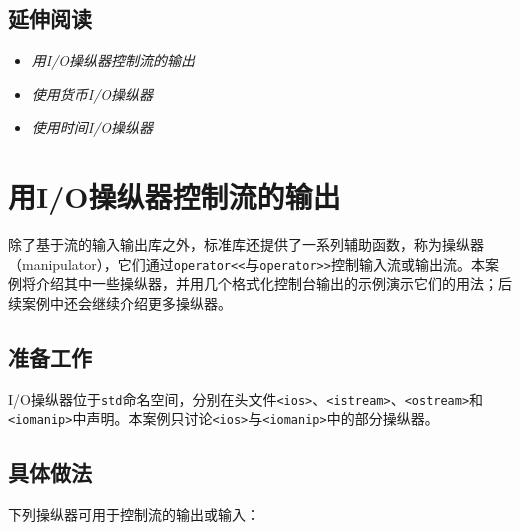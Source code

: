 
\subsection{延伸阅读}



\begin{itemize}
\item \textit{用I/O操纵器控制流的输出}



\item \textit{使用货币I/O操纵器}



\item \textit{使用时间I/O操纵器}

\end{itemize}



\section{用I/O操纵器控制流的输出}



除了基于流的输入输出库之外，标准库还提供了一系列辅助函数，称为操纵器（manipulator），它们通过\texttt{operator<<}与\texttt{operator>>}控制输入流或输出流。本案例将介绍其中一些操纵器，并用几个格式化控制台输出的示例演示它们的用法；后续案例中还会继续介绍更多操纵器。



\subsection{准备工作}



I/O操纵器位于\texttt{std}命名空间，分别在头文件\texttt{<\allowbreak{}ios>}、\texttt{<\allowbreak{}istream>}、\texttt{<\allowbreak{}ostream>}和\texttt{<\allowbreak{}iomanip>}中声明。本案例只讨论\texttt{<\allowbreak{}ios>}与\texttt{<\allowbreak{}iomanip>}中的部分操纵器。



\subsection{具体做法}



下列操纵器可用于控制流的输出或输入：


